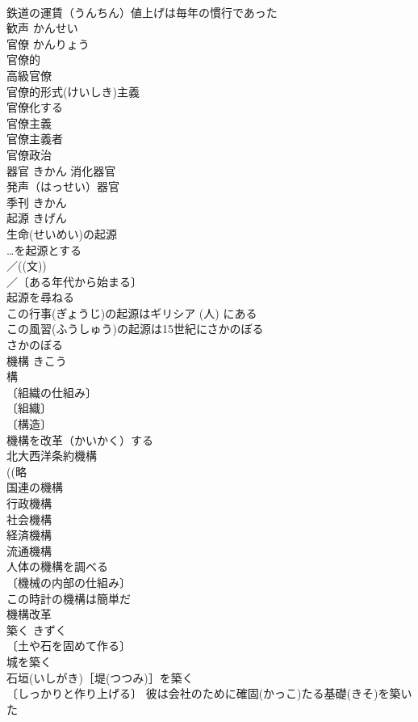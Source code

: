 \documentclass[8pt]{extreport}
\begin{document}
\begin{CJK}{UTF8}{min}
\\	鉄道の運賃（うんちん）値上げは毎年の慣行であった 
\\	歓声	かんせい	
\\	官僚	かんりょう	
\\	官僚的 
\\	高級官僚 
\\	官僚的形式(けいしき)主義 
\\	官僚化する 
\\	官僚主義 
\\	官僚主義者 
\\	官僚政治 
\\	器官	きかん	消化器官 
\\	発声（はっせい）器官 
\\	季刊	きかん	
\\	起源	きげん	
\\	生命(せいめい)の起源 
\\	…を起源とする 
\\	／((文)) 
\\	／〔ある年代から始まる〕
\\	起源を尋ねる 
\\	この行事(ぎょうじ)の起源はギリシア (人) にある 
\\	この風習(ふうしゅう)の起源は15世紀にさかのぼる 
\\	さかのぼる　
\\	機構	きこう	
\\	構 
\\	〔組織の仕組み〕
\\	〔組織〕
\\	〔構造〕
\\	機構を改革（かいかく）する 
\\	北大西洋条約機構 
\\	((略
\\	国連の機構 
\\	行政機構 
\\	社会機構 
\\	経済機構 
\\	流通機構 
\\	人体の機構を調べる 
\\	〔機械の内部の仕組み〕
\\	この時計の機構は簡単だ 
\\	機構改革 
\\	築く	きずく	
\\	〔土や石を固めて作る〕
\\	城を築く 
\\	石垣(いしがき)［堤(つつみ)］を築く 
\\	〔しっかりと作り上げる〕 彼は会社のために確固(かっこ)たる基礎(きそ)を築いた 

\end{CJK}
\end{document}
